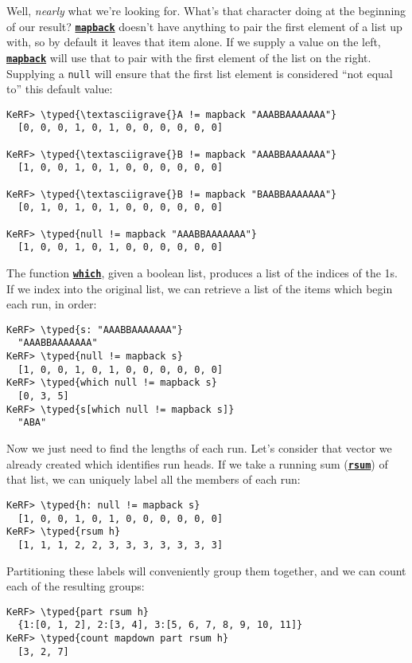 \documentclass{article}
\newcommand{\typed}[1]{\textcolor{TealBlue}{#1}}
\newcommand{\primu}[2]{\hyperref[prim:#2]{\textbf{\texttt{#1}}}}
\newcommand{\prim}[1]{\primu{#1}{#1}}
\newcommand{\comb}[1]{\primu{#1}{#1}}
\begin{document}
Well, \emph{nearly} what we're looking for. What's that character doing at the beginning of our result? \comb{mapback} doesn't have anything to pair the first element of a list up with, so by default it leaves that item alone. If we supply a value on the left, \comb{mapback} will use that to pair with the first element of the list on the right. Supplying a \texttt{null} will ensure that the first list element is considered ``not equal to'' this default value:
\begin{Verbatim}
KeRF> \typed{\textasciigrave{}A != mapback "AAABBAAAAAAA"}
  [0, 0, 0, 1, 0, 1, 0, 0, 0, 0, 0, 0]

KeRF> \typed{\textasciigrave{}B != mapback "AAABBAAAAAAA"}
  [1, 0, 0, 1, 0, 1, 0, 0, 0, 0, 0, 0]

KeRF> \typed{\textasciigrave{}B != mapback "BAABBAAAAAAA"}
  [0, 1, 0, 1, 0, 1, 0, 0, 0, 0, 0, 0]

KeRF> \typed{null != mapback "AAABBAAAAAAA"}
  [1, 0, 0, 1, 0, 1, 0, 0, 0, 0, 0, 0]
\end{Verbatim}

\pagebreak
The function \prim{which}, given a boolean list, produces a list of the indices of the 1s. If we index into the original list, we can retrieve a list of the items which begin each run, in order:
\begin{Verbatim}
KeRF> \typed{s: "AAABBAAAAAAA"}
  "AAABBAAAAAAA"
KeRF> \typed{null != mapback s}
  [1, 0, 0, 1, 0, 1, 0, 0, 0, 0, 0, 0]
KeRF> \typed{which null != mapback s}
  [0, 3, 5]
KeRF> \typed{s[which null != mapback s]}
  "ABA"
\end{Verbatim}

Now we just need to find the lengths of each run. Let's consider that vector we already created which identifies run heads. If we take a running sum (\prim{rsum}) of that list, we can uniquely label all the members of each run:
\begin{Verbatim}
KeRF> \typed{h: null != mapback s}
  [1, 0, 0, 1, 0, 1, 0, 0, 0, 0, 0, 0]
KeRF> \typed{rsum h}
  [1, 1, 1, 2, 2, 3, 3, 3, 3, 3, 3, 3]
\end{Verbatim}

Partitioning these labels will conveniently group them together, and we can count each of the resulting groups:
\begin{Verbatim}
KeRF> \typed{part rsum h}
  {1:[0, 1, 2], 2:[3, 4], 3:[5, 6, 7, 8, 9, 10, 11]}
KeRF> \typed{count mapdown part rsum h}
  [3, 2, 7]
\end{Verbatim}
\end{document}
